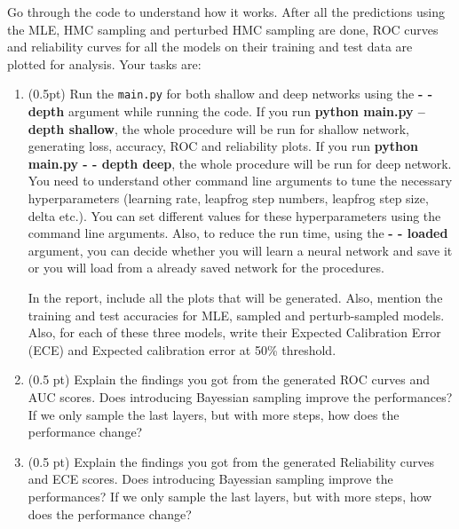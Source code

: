\begin{enumerate}
Go through the code to understand how it works. After all the predictions using the MLE, HMC sampling and perturbed HMC sampling are done, ROC curves and reliability curves for all the models on their training and test data are plotted for analysis. Your tasks are:
\begin{enumerate}
    \item (0.5pt) Run the \texttt{main.py} for both shallow and deep networks using the \textbf{- - depth} argument while running the code. If you run \textbf{python main.py --depth shallow}, the whole procedure will be run for shallow network, generating loss, accuracy, ROC and reliability plots. If you run \textbf{python main.py - - depth deep}, the whole procedure will be run for deep network. You need to understand other command line arguments to tune the necessary hyperparameters (learning rate, leapfrog step numbers, leapfrog step size, delta etc.). You can set different values for these hyperparameters using the command line arguments. Also, to reduce the run time, using the \textbf{- - loaded} argument, you can decide whether you will learn a neural network and save it or you will load from a already saved network for the procedures. 
    
    In the report, include all the plots that will be generated. Also, mention the training and test accuracies for MLE, sampled and perturb-sampled models. Also, for each of these three models, write their Expected Calibration Error (ECE) and Expected calibration error at 50\% threshold.
    \item (0.5 pt) Explain the findings you got from the generated ROC curves and AUC scores. Does introducing Bayessian sampling improve the performances? If we only sample the last layers, but with more steps, how does the performance change?
    
    \item (0.5 pt) Explain the findings you got from the generated Reliability curves and ECE scores. Does introducing Bayessian sampling improve the performances? If we only sample the last layers, but with more steps, how does the performance change?
\end{enumerate}


     
%

\end{enumerate}

%
